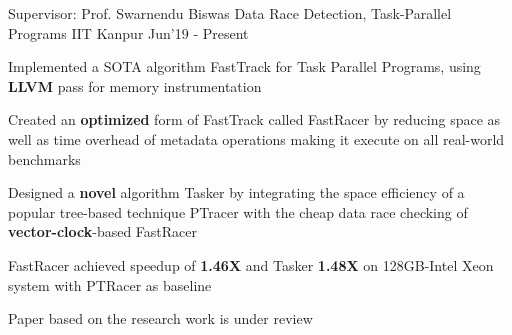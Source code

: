 
\begin{cventries}

  \cventry
  {Supervisor: Prof. Swarnendu Biswas}
  {Data Race Detection, Task-Parallel Programs}
  {IIT Kanpur}
  {Jun'19 - Present}
  {
    \begin{cvitems}
 \item Implemented a SOTA algorithm FastTrack for Task Parallel Programs, using \textbf{LLVM} pass for memory instrumentation
 \item Created an \textbf{optimized} form of FastTrack called FastRacer by reducing space as well as time overhead of metadata operations making it execute on all real-world benchmarks
 \item Designed a \textbf{novel} algorithm Tasker by integrating the space efficiency of a popular tree-based technique PTracer with the cheap data race checking of \textbf{vector-clock}-based FastRacer
 \item FastRacer achieved speedup of \textbf{1.46X} and Tasker \textbf{1.48X} on 128GB-Intel Xeon system with PTRacer as baseline
 
% 
 \item Paper based on the research work is under review
    \end{cvitems}
  }

\end{cventries}
